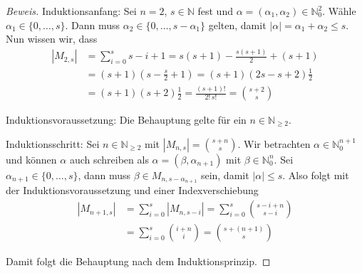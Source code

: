 \documentclass{article}
\begin{document}
	\begin{proof}[Beweis]
	Induktionsanfang: Sei \(n = 2\), \(s \in \mathbb{N}\) fest und \(\alpha = (\alpha_{1}, 
	\alpha_{2}) \in \mathbb{N}^{2}_{0}\). Wähle \(\alpha_{1} \in \{0, \ldots, s\}\). Dann muss
	\(\alpha_{2} \in \{0, \ldots, s - \alpha_{1}\}\) gelten, damit \(|\alpha| = \alpha_{1} +
	\alpha_{2} \leq s\). Nun wissen wir, dass
	\begin{align*}
		|M_{2,s}| &= \sum_{i=0}^{s} s-i+1 = s(s+1) - \frac{s(s+1)}{2} + (s+1) \\
		&= (s+1)(s - \frac{s}{2} + 1) = (s+1)(2s - s +2)\frac{1}{2} \\
		&= (s+1)(s+2)\frac{1}{2} = \frac{(s+1)!}{2!\,s!} = \binom{s+2}{s}
	\end{align*}
	
	Induktionsvoraussetzung: Die Behauptung gelte für ein \(n \in \mathbb{N}_{\geq 2}\).

	Induktionsschritt: Sei \(n \in \mathbb{N}_{\geq 2}\) mit \(|M_{n,s}| = \binom{s + n}{s}\). Wir
	betrachten \(\alpha \in \mathbb{N}^{n+1}_{0}\) und können \(\alpha\) auch schreiben als
	\(\alpha = (\beta, \alpha_{n+1})\) mit \(\beta \in \mathbb{N}^{n}_{0}\). Sei \(\alpha_{n+1}
	\in \{0, \ldots, s\}\), dann muss \(\beta \in M_{n,s-\alpha_{n+1}}\) sein, damit
	\(|\alpha| \leq s\). Also folgt mit der Induktionsvoraussetzung und einer Indexverschiebung
	\begin{align*}
		|M_{n+1,s}| &= \sum_{i=0}^{s} |M_{n,s-i}| = \sum_{i=0}^{s} \binom{s-i+n}{s-i} \\
		&= \sum_{i=0}^{s} \binom{i+n}{i} = \binom{s+(n+1)}{s}
	\end{align*}

	Damit folgt die Behauptung nach dem Induktionsprinzip.
	\end{proof}
\end{document}
